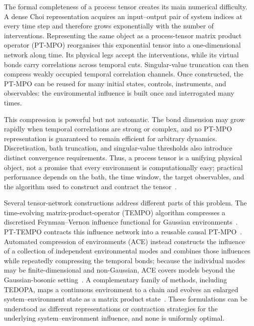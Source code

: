 The formal completeness of a process tensor creates its main numerical difficulty.  A dense Choi representation acquires an input--output pair of system indices at every time step and therefore grows exponentially with the number of interventions.  Representing the same object as a process-tensor matrix product operator (PT-MPO) reorganises this exponential tensor into a one-dimensional network along time.  Its physical legs accept the interventions, while its virtual bonds carry correlations across temporal cuts.  Singular-value truncation can then compress weakly occupied temporal correlation channels.  Once constructed, the PT-MPO can be reused for many initial states, controls, instruments, and observables: the environmental influence is built once and interrogated many times.

This compression is powerful but not automatic.  The bond dimension may grow rapidly when temporal correlations are strong or complex, and no PT-MPO representation is guaranteed to remain efficient for arbitrary dynamics.  Discretisation, bath truncation, and singular-value thresholds also introduce distinct convergence requirements.  Thus, a process tensor is a unifying physical object, not a promise that every environment is computationally easy; practical performance depends on the bath, the time window, the target observables, and the algorithm used to construct and contract the tensor~\cite{Keeling2026,LacroixReview2026}.

Several tensor-network constructions address different parts of this problem.  The time-evolving matrix-product-operator (TEMPO) algorithm compresses a discretised Feynman--Vernon influence functional for Gaussian environments~\cite{FeynmanVernon1963,Strathearn2018}.  PT-TEMPO contracts this influence network into a reusable causal PT-MPO~\cite{Jorgensen2019}.  Automated compression of environments (ACE) instead constructs the influence of a collection of independent environmental modes and combines those influences while repeatedly compressing the temporal bonds; because the individual modes may be finite-dimensional and non-Gaussian, ACE covers models beyond the Gaussian-bosonic setting~\cite{Cygorek2022}.  A complementary family of methods, including TEDOPA, maps a continuous environment to a chain and evolves an enlarged system--environment state as a matrix product state~\cite{Chin2010,Prior2010}.  These formulations can be understood as different representations or contraction strategies for the underlying system--environment influence, and none is uniformly optimal.

